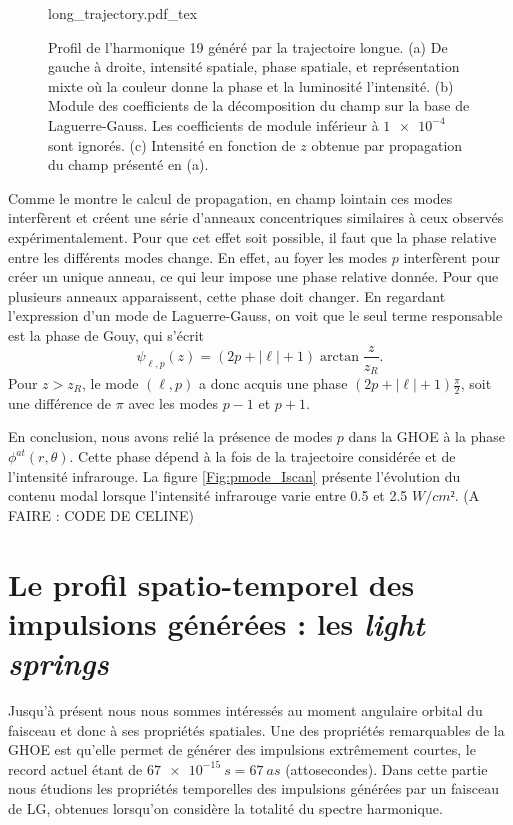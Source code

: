 \begin{figure}[!ht]
\centering
\def\svgwidth{\columnwidth}
{long_trajectory.pdf_tex}
\caption{Profil de l'harmonique 19 généré par la trajectoire longue. (a) De gauche à droite, intensité spatiale, phase spatiale, et représentation mixte où la couleur donne la phase et la luminosité l'intensité. (b) Module des coefficients de la décomposition du champ sur la base de Laguerre-Gauss. Les coefficients de module inférieur à $\num{1e-4}$ sont ignorés. (c) Intensité en fonction de $z$ obtenue par propagation du champ présenté en (a).}
\label{Fig:DecompLong}
\end{figure}

Comme le montre le calcul de propagation, en champ lointain ces modes interfèrent et créent une série d'anneaux concentriques similaires à ceux observés expérimentalement. Pour que cet effet soit possible, il faut que la phase relative entre les différents modes change. En effet, au foyer les modes $p$ interfèrent pour créer un unique anneau, ce qui leur impose une phase relative donnée. Pour que plusieurs anneaux apparaissent, cette phase doit changer. En regardant l'expression d'un mode de Laguerre-Gauss, on voit que le seul terme responsable est la phase de Gouy, qui s'écrit
\begin{equation*}
\psi _{\ell ,p}(z)=(2p+\left|\ell\right|+1)\arctan{\frac{z}{z_R}}.
\end{equation*}
Pour $z>z_R$, le mode $(\ell,p)$ a donc acquis une phase $(2p+\left|\ell\right|+1)\frac{\pi}{2}$, soit une différence de $\pi$ avec les modes $p-1$ et $p+1$. 

En conclusion, nous avons relié la présence de modes $p$ dans la GHOE à la phase $\phi^{at}(r,\theta)$. Cette phase dépend à la fois de la trajectoire considérée et de l'intensité infrarouge. La figure \ref{Fig:pmode_Iscan} présente l'évolution du contenu modal lorsque l'intensité infrarouge varie entre 0.5 et 2.5 $\si{W/cm²}$. (A FAIRE : CODE DE CELINE)

\section{Le profil spatio-temporel des impulsions générées : les \textit{light springs}}
Jusqu'à présent nous nous sommes intéressés au moment angulaire orbital du faisceau et donc à ses propriétés spatiales. Une des propriétés remarquables de la GHOE est qu'elle permet de générer des impulsions extrêmement courtes, le record actuel étant de $\SI{67e-15}{s}=\SI{67}{as}$ (attosecondes). Dans cette partie nous étudions les propriétés temporelles des impulsions générées par un faisceau de LG, obtenues lorsqu'on considère la totalité du spectre harmonique.

